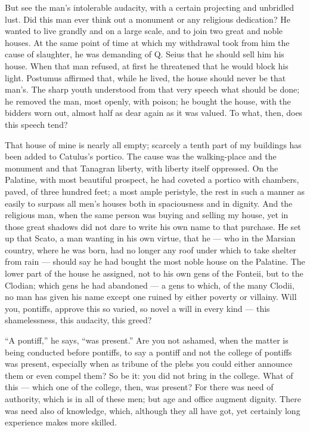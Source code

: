  But see the man's intolerable audacity, with a certain projecting and unbridled lust. Did this man ever think out a monument or any religious dedication? He wanted to live grandly and on a large scale, and to join two great and noble houses. At the same point of time at which my withdrawal took from him the cause of slaughter, he was demanding of Q. Seius that he should sell him his house. When that man refused, at first he threatened that he would block his light. Postumus affirmed that, while he lived, the house should never be that man's. The sharp youth understood from that very speech what should be done; he removed the man, most openly, with poison; he bought the house, with the bidders worn out, almost half as dear again as it was valued. To what, then, does this speech tend?

 That house of mine is nearly all empty; scarcely a tenth part of my buildings has been added to Catulus's portico. The cause was the walking-place and the monument and that Tanagran liberty, with liberty itself oppressed. On the Palatine, with most beautiful prospect, he had coveted a portico with chambers, paved, of three hundred feet; a most ample peristyle, the rest in such a manner as easily to surpass all men's houses both in spaciousness and in dignity. And the religious man, when the same person was buying and selling my house, yet in those great shadows did not dare to write his own name to that purchase. He set up that Scato, a man wanting in his own virtue, that he --- who in the Marsian country, where he was born, had no longer any roof under which to take shelter from rain --- should say he had bought the most noble house on the Palatine. The lower part of the house he assigned, not to his own gens of the Fonteii, but to the Clodian; which gens he had abandoned --- a gens to which, of the many Clodii, no man has given his name except one ruined by either poverty or villainy. Will you, pontiffs, approve this so varied, so novel a will in every kind --- this shamelessness, this audacity, this greed?

 ``A pontiff,'' he says, ``was present.'' Are you not ashamed, when the matter is being conducted before pontiffs, to say a pontiff and not the college of pontiffs was present, especially when as tribune of the plebs you could either announce them or even compel them? So be it: you did not bring in the college. What of this --- which one of the college, then, was present? For there was need of authority, which is in all of these men; but age and office augment dignity. There was need also of knowledge, which, although they all have got, yet certainly long experience makes more skilled.

